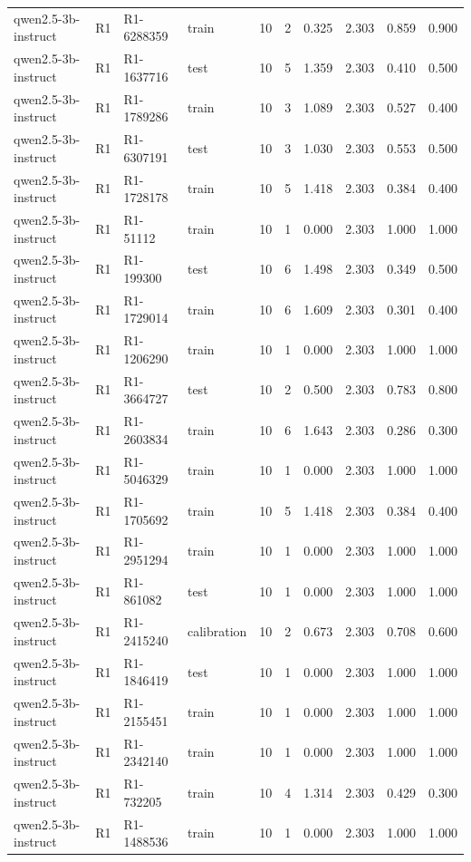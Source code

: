 \begin{table}
\begin{tabular}{llllrrrrrr}
qwen2.5-3b-instruct & R1 & R1-6288359 & train & 10 & 2 & 0.325 & 2.303 & 0.859 & 0.900 \\
qwen2.5-3b-instruct & R1 & R1-1637716 & test & 10 & 5 & 1.359 & 2.303 & 0.410 & 0.500 \\
qwen2.5-3b-instruct & R1 & R1-1789286 & train & 10 & 3 & 1.089 & 2.303 & 0.527 & 0.400 \\
qwen2.5-3b-instruct & R1 & R1-6307191 & test & 10 & 3 & 1.030 & 2.303 & 0.553 & 0.500 \\
qwen2.5-3b-instruct & R1 & R1-1728178 & train & 10 & 5 & 1.418 & 2.303 & 0.384 & 0.400 \\
qwen2.5-3b-instruct & R1 & R1-51112 & train & 10 & 1 & 0.000 & 2.303 & 1.000 & 1.000 \\
qwen2.5-3b-instruct & R1 & R1-199300 & test & 10 & 6 & 1.498 & 2.303 & 0.349 & 0.500 \\
qwen2.5-3b-instruct & R1 & R1-1729014 & train & 10 & 6 & 1.609 & 2.303 & 0.301 & 0.400 \\
qwen2.5-3b-instruct & R1 & R1-1206290 & train & 10 & 1 & 0.000 & 2.303 & 1.000 & 1.000 \\
qwen2.5-3b-instruct & R1 & R1-3664727 & test & 10 & 2 & 0.500 & 2.303 & 0.783 & 0.800 \\
qwen2.5-3b-instruct & R1 & R1-2603834 & train & 10 & 6 & 1.643 & 2.303 & 0.286 & 0.300 \\
qwen2.5-3b-instruct & R1 & R1-5046329 & train & 10 & 1 & 0.000 & 2.303 & 1.000 & 1.000 \\
qwen2.5-3b-instruct & R1 & R1-1705692 & train & 10 & 5 & 1.418 & 2.303 & 0.384 & 0.400 \\
qwen2.5-3b-instruct & R1 & R1-2951294 & train & 10 & 1 & 0.000 & 2.303 & 1.000 & 1.000 \\
qwen2.5-3b-instruct & R1 & R1-861082 & test & 10 & 1 & 0.000 & 2.303 & 1.000 & 1.000 \\
qwen2.5-3b-instruct & R1 & R1-2415240 & calibration & 10 & 2 & 0.673 & 2.303 & 0.708 & 0.600 \\
qwen2.5-3b-instruct & R1 & R1-1846419 & test & 10 & 1 & 0.000 & 2.303 & 1.000 & 1.000 \\
qwen2.5-3b-instruct & R1 & R1-2155451 & train & 10 & 1 & 0.000 & 2.303 & 1.000 & 1.000 \\
qwen2.5-3b-instruct & R1 & R1-2342140 & train & 10 & 1 & 0.000 & 2.303 & 1.000 & 1.000 \\
qwen2.5-3b-instruct & R1 & R1-732205 & train & 10 & 4 & 1.314 & 2.303 & 0.429 & 0.300 \\
qwen2.5-3b-instruct & R1 & R1-1488536 & train & 10 & 1 & 0.000 & 2.303 & 1.000 & 1.000 \\

\end{tabular}
\end{table}
